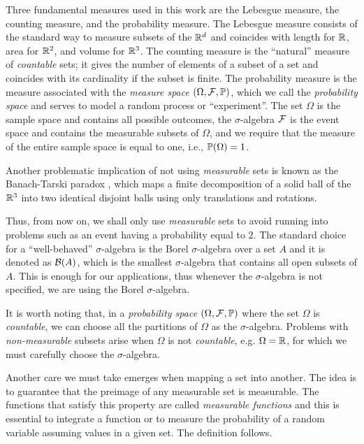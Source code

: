 Three fundamental measures used in this work are the Lebesgue measure, the counting measure, and the probability measure.
%
The Lebesgue measure consists of the standard way to measure subsets of the $\R^d$ and coincides with length for $\R$, area for $\R^2$, and volume for $\R^3$.
%
The counting measure is the ``natural'' measure of \textit{countable} sets; it gives the number of elements of a subset of a set and coincides with its cardinality if the subset is finite.
%
The probability measure is the measure associated with the \textit{measure space} $(\Omega,\cal{F},\P)$, which we call the \textit{probability space} and serves to model a random process or ``experiment''. The set $\Omega$ is the sample space and contains all possible outcomes, the $\sigma$-algebra $\cal{F}$ is the event space and contains the measurable subsets of $\Omega$, and we require that the measure of the entire sample space is equal to one, i.e., $\P(\Omega) = 1$.

Another problematic implication of not using \textit{measurable} sets is known as the Banach-Tarski paradox \cite{banach1924decomposition}, which maps a finite decomposition of a solid ball of the $\R^3$ into two identical disjoint balls using only translations and rotations.

Thus, from now on, we shall only use \textit{measurable} sets to avoid running into problems such as an event having a probability equal to $2$.
%
The standard choice for a ``well-behaved'' $\sigma$-algebra is the Borel $\sigma$-algebra over a set $A$ and it is denoted as $\cal{B}(A)$, which is the smallest $\sigma$-algebra that contains all open subsets of $A$.
%
This is enough for our applications, thus whenever the $\sigma$-algebra is not specified, we are using the Borel $\sigma$-algebra.

It is worth noting that, in a \textit{probability space} $(\Omega,\cal{F},\P)$ where the set $\Omega$ is \textit{countable}, we can choose all the partitions of $\Omega$ as the $\sigma$-algebra.
%
Problems with \textit{non-measurable} subsets arise when $\Omega$ is not \textit{countable}, e.g. $\Omega = \R$, for which we must carefully choose the $\sigma$-algebra.

Another care we must take emerges when mapping a set into another. The idea is to guarantee that the preimage of any measurable set is measurable.
%
The functions that satisfy this property are called \textit{measurable functions} and this is essential to integrate a function or to measure the probability of a random variable assuming values in a given set.
%
The definition follows.

